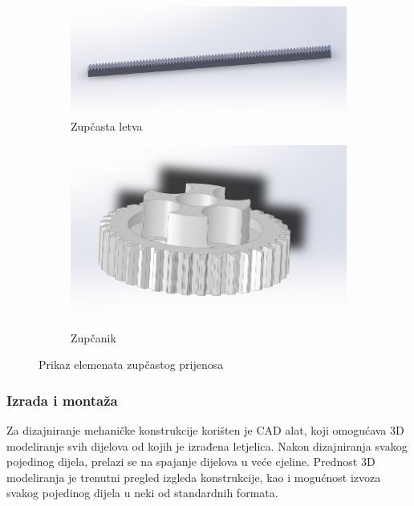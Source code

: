 \documentclass[11pt,a4paper]{article}
\begin{document}
\begin{figure}[H]
\centering
\begin{subfigure}{.5\textwidth}
  \centering
  \includegraphics[width=.9\linewidth]{figures/gear_rack_6mm.png}
  \caption{Zupčasta letva}
  \label{fig:gear_rack}
\end{subfigure}%
\begin{subfigure}{.5\textwidth}
  \centering
  \includegraphics[width=.9\linewidth]{figures/gear_25_07.png}
  \caption{Zupčanik}
  \label{fig:gear_gear}
\end{subfigure}

\caption{Prikaz elemenata zupčastog prijenosa}
\label{fig:gear}
\end{figure}


\subsubsection{Izrada i montaža}

Za dizajniranje mehaničke konstrukcije korišten je CAD alat, koji omogućava 3D modeliranje svih dijelova od kojih je izrađena letjelica. Nakon dizajniranja svakog pojedinog dijela, prelazi se na spajanje dijelova u veće cjeline. Prednost 3D modeliranja je trenutni pregled izgleda konstrukcije, kao i mogućnost izvoza svakog pojedinog dijela u neki od standardnih formata. 
\end{document}
